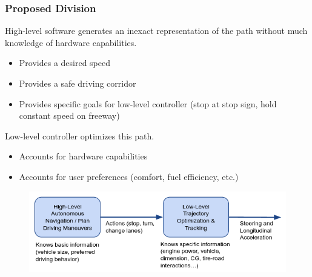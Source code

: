 \documentclass{beamer}
\begin{document}
	
	
	

\begin{frame}
\frametitle{Proposed Division}
High-level software generates an inexact representation of the path without much knowledge of hardware capabilities.
\begin{itemize}
\item Provides a desired speed
\item Provides a safe driving corridor
\item Provides specific goals for low-level controller (stop at stop sign, hold constant speed on freeway)
\end{itemize}

Low-level controller optimizes this path.
\begin{itemize}
\item Accounts for hardware capabilities
\item Accounts for user preferences (comfort, fuel efficiency, etc.)
\end{itemize}
\vspace{-0.5em}
\begin{figure}
\includegraphics[width=0.9\linewidth]{division.png}
\end{figure}
\end{frame}
\end{document}
